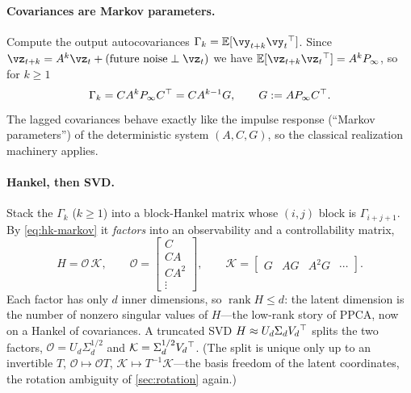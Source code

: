 \documentclass[11pt]{article}
\theoremstyle{plain}
\theoremstyle{definition}
\theoremstyle{remark}
\theoremstyle{definition}
\newcommand{\E}{\mathbb{E}}
\DeclareMathOperator{\rank}{rank}
\begin{document}
\paragraph{Covariances are Markov parameters.} Compute the output autocovariances
$\Gamma_k = \E[\vy_{t+k}\vy_t\trp]$. Since $\vz_{t+k} = A^k\vz_t + (\text{future
noise} \perp \vz_t)$ we have $\E[\vz_{t+k}\vz_t\trp] = A^k P_\infty$, so for $k \ge
1$
\begin{equation}\label{eq:hk-markov}
  \Gamma_k = C A^{k} P_\infty C{^\top} = C A^{k-1} G, \qquad G := A P_\infty C{^\top} .
\end{equation}
The lagged covariances behave exactly like the impulse response (``Markov
parameters'') of the deterministic system $(A, C, G)$, so the classical
realization machinery applies.

\paragraph{Hankel, then SVD.} Stack the $\Gamma_k$ ($k\ge1$) into a block-Hankel
matrix whose $(i,j)$ block is $\Gamma_{i+j+1}$. By \eqref{eq:hk-markov} it
\emph{factors} into an observability and a controllability matrix,
\begin{equation}\label{eq:hk-factor}
  H = \mathcal{O}\,\mathcal{K},
  \qquad
  \mathcal{O} = \begin{bmatrix} C \\ CA \\ CA^2 \\ \vdots \end{bmatrix},
  \qquad
  \mathcal{K} = \begin{bmatrix} G & AG & A^2 G & \cdots \end{bmatrix} .
\end{equation}
Each factor has only $d$ inner dimensions, so $\rank H \le d$: the latent
dimension is the number of nonzero singular values of $H$---the low-rank story of
PPCA, now on a Hankel of covariances. A truncated SVD $H \approx U_d \Sigma_d
V_d{^\top}$ splits the two factors, $\mathcal{O} = U_d \Sigma_d^{1/2}$ and
$\mathcal{K} = \Sigma_d^{1/2} V_d{^\top}$. (The split is unique only up to an
invertible $T$, $\mathcal O \mapsto \mathcal O T$, $\mathcal K \mapsto
T^{-1}\mathcal K$---the basis freedom of the latent coordinates, the rotation
ambiguity of \cref{sec:rotation} again.)
\end{document}
